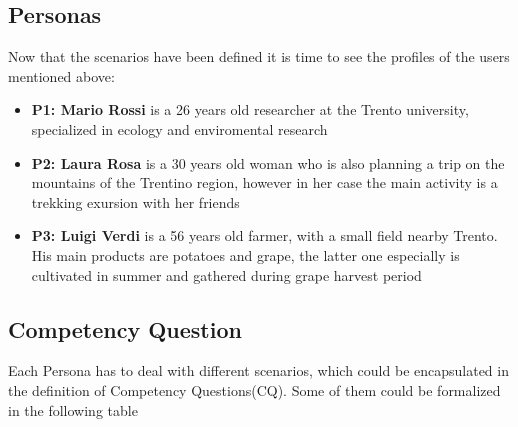 \subsection{Personas}

Now that the scenarios have been defined it is time to see the profiles of the users mentioned above:

\begin{itemize}
  \item \textbf{P1: Mario Rossi} is a 26 years old researcher at the Trento university, specialized in ecology and enviromental research
  \item \textbf{P2: Laura Rosa} is a 30 years old woman who is also planning a trip on the mountains of the Trentino region, however
                            in her case the main activity is a trekking exursion with her friends
  \item \textbf{P3: Luigi Verdi} is a 56 years old farmer, with a small field nearby Trento. His main products are
                             potatoes and grape, the latter one especially is cultivated in summer
                             and gathered during grape harvest period
\end{itemize}

\subsection{Competency Question}

Each Persona has to deal with different scenarios, which could be encapsulated in the definition
of Competency Questions(CQ). Some of them could be formalized in the following table

